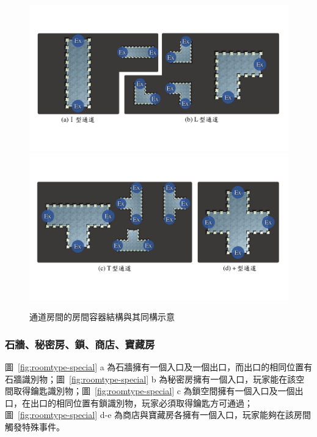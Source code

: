 \begin{figure}[!htb]
  \begin{center}
    \includegraphics[width=1.0\textwidth]{figures/roomtype-mainpath-ii.pdf}
    \includegraphics[width=1.0\textwidth]{figures/roomtype-mainpath-ii-.pdf}
    \caption{通道房間的房間容器結構與其同構示意}
    \label{fig:roomtype-mainpath-ii}
  \end{center}
\end{figure}

\subsubsection{石牆、秘密房、鎖、商店、寶藏房}
\label{sssec:method-spacepieces-types-special}

圖~\ref{fig:roomtype-special} a 為石牆擁有一個入口及一個出口，而出口的相同位置有石牆識別物；圖~\ref{fig:roomtype-special} b 為秘密房擁有一個入口，玩家能在該空間取得鑰匙識別物；圖~\ref{fig:roomtype-special} c 為鎖空間擁有一個入口及一個出口，在出口的相同位置有鎖識別物，玩家必須取得鑰匙方可通過；圖~\ref{fig:roomtype-special} d-e 為商店與寶藏房各擁有一個入口，玩家能夠在該房間觸發特殊事件。

